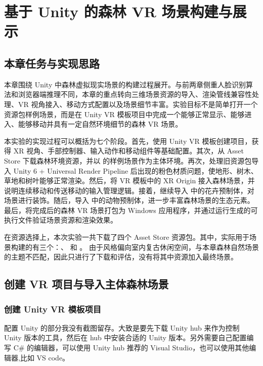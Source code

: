 \section{基于 Unity 的森林 VR 场景构建与展示}

\subsection{本章任务与实现思路}

本章围绕 Unity 中森林虚拟现实场景的构建过程展开。与前两章侧重人脸识别算法和浏览器端推理不同，本章的重点转向三维场景资源的导入、渲染管线兼容性处理、VR 视角接入、移动方式配置以及场景细节丰富。实验目标不是简单打开一个资源包样例场景，而是在 Unity VR 模板项目中完成一个能够正常显示、能够进入、能够移动并具有一定自然环境细节的森林 VR 场景。

本实验的实现过程可以概括为七个阶段。首先，使用 Unity VR 模板创建项目，获得 XR 视角、手部控制器、输入动作和移动组件等基础配置。其次，从 Asset Store 下载森林环境资源，并以  的样例场景作为主体环境。再次，处理旧资源包导入 Unity 6 + Universal Render Pipeline 后出现的粉色材质问题，使地形、树木、草地和树叶能够正常渲染。然后，将 VR 模板中的 XR Origin 接入森林场景，并说明连续移动和传送移动的输入管理逻辑。接着，继续导入  中的花卉预制体，对场景进行装饰。随后，导入  中的动物预制体，进一步丰富森林场景的生态元素。最后，将完成后的森林 VR 场景打包为 Windows 应用程序，并通过运行生成的可执行文件验证场景资源和渲染效果。

在资源选择上，本次实验一共下载了四个 Asset Store 资源包。其中，实际用于场景构建的有三个：、 和 。 由于风格偏向室内复古休闲空间，与本章森林自然场景的主题不匹配，因此只进行了下载和评估，没有将其中资源加入最终场景。

\subsection{创建 VR 项目与导入主体森林场景}

\subsubsection{创建 Unity VR 模板项目}

配置 Unity 的部分我没有截图留存。大致是要先下载 Unity hub 来作为控制 Unity 版本的工具，然后在 hub 中安装合适的 Unity 版本。另外需要自己配置编写 C# 的编辑器，可以使用 Unity hub 推荐的 Visual Studio，也可以使用其他编辑器,比如 VS code。

